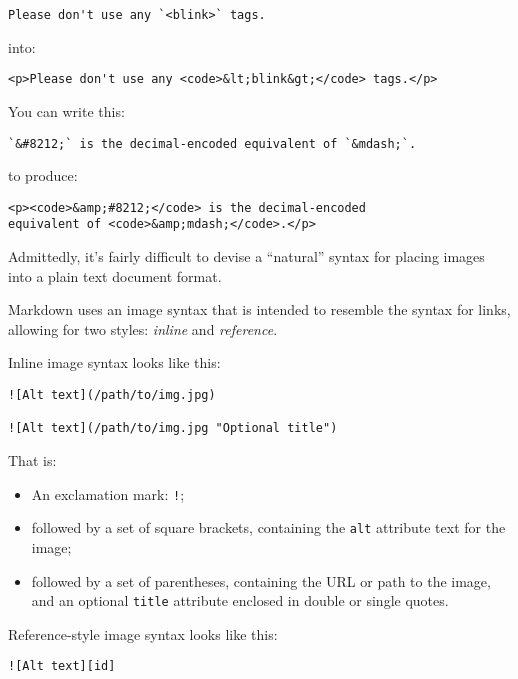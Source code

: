 \begin{verbatim}
Please don't use any `<blink>` tags.
\end{verbatim}

into:

\begin{verbatim}
<p>Please don't use any <code>&lt;blink&gt;</code> tags.</p>
\end{verbatim}

You can write this:

\begin{verbatim}
`&#8212;` is the decimal-encoded equivalent of `&mdash;`.
\end{verbatim}

to produce:

\begin{verbatim}
<p><code>&amp;#8212;</code> is the decimal-encoded
equivalent of <code>&amp;mdash;</code>.</p>
\end{verbatim}

Admittedly, it's fairly difficult to devise a ``natural'' syntax for
placing images into a plain text document format.

Markdown uses an image syntax that is intended to resemble the syntax
for links, allowing for two styles: \emph{inline} and \emph{reference}.

Inline image syntax looks like this:

\begin{verbatim}
![Alt text](/path/to/img.jpg)

![Alt text](/path/to/img.jpg "Optional title")
\end{verbatim}

That is:

\begin{itemize}
\item An exclamation mark: \texttt{!};

\item followed by a set of square brackets, containing the \texttt{alt}
attribute text for the image;

\item followed by a set of parentheses, containing the URL or path to
the image, and an optional \texttt{title} attribute enclosed in double
or single quotes.

\end{itemize}

Reference-style image syntax looks like this:

\begin{verbatim}
![Alt text][id]
\end{verbatim}

